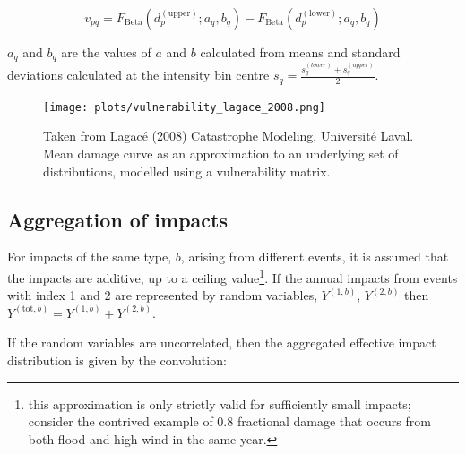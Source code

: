 \documentclass[a4paper,11pt]{extarticle} %
\begin{document}
\begin{equation}
	\label{Eq:BetaVuln}
	v_{pq} = F_{\text{Beta}}(d_p^{(\text{upper})}; a_q, b_q) - F_{\text{Beta}}(d_p^{(\text{lower})}; a_q, b_q)
\end{equation}

$a_q$ and $b_q$ are the values of $a$ and $b$ calculated from means and standard deviations calculated at the intensity bin centre $s_q = \frac{s_q^{(lower)} + s_q^{(upper)}}{2}$.

\begin{figure}[ht]

    \begin{framed}

		\texttt{[image: plots/vulnerability\_lagace\_2008.png]}

    \end{framed}

    \footnotesize

    \renewcommand{\arraystretch}{1.01}

    \vspace{-3ex}


    \vspace{-0.5ex}

    \caption{\small Taken from Lagacé (2008) Catastrophe Modeling, Université Laval. Mean damage curve as an approximation to an underlying set of distributions, modelled using a vulnerability matrix.}
    \label{Fig:vulnerability_matrix}

\end{figure}


\subsection{Aggregation of impacts}
For impacts of the same type, $b$, arising from different events, it is assumed that the impacts are additive, up to a ceiling value\footnote{this approximation is only strictly valid for sufficiently small impacts; consider the contrived example of 0.8 fractional damage that occurs from both flood and high wind in the same year.}. If the annual impacts from events with index 1 and 2 are represented by random variables, $Y^{(1,b)}$, $Y^{(2,b)}$ then $Y^{(\text{tot}, b)} = Y^{(1,b)} + Y^{(2,b)}$.

If the random variables are uncorrelated, then the aggregated effective impact distribution is given by the convolution:
\end{document}
